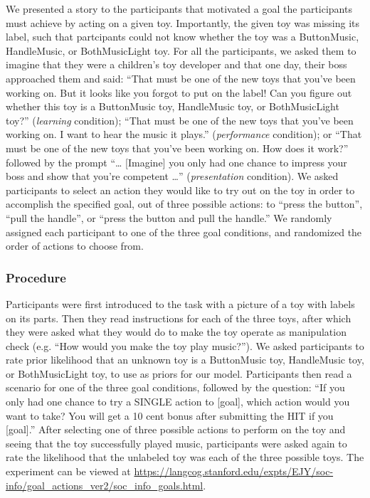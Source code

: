 \documentclass[10pt, letterpaper]{article}
\begin{document}
We presented a story to the participants that motivated a goal the
participants must achieve by acting on a given toy. Importantly, the
given toy was missing its label, such that partcipants could not know
whether the toy was a ButtonMusic, HandleMusic, or BothMusicLight toy.
For all the participants, we asked them to imagine that they were a
children's toy developer and that one day, their boss approached them
and said: ``That must be one of the new toys that you've been working
on. But it looks like you forgot to put on the label! Can you figure out
whether this toy is a ButtonMusic toy, HandleMusic toy, or
BothMusicLight toy?'' (\emph{learning} condition); ``That must be one of
the new toys that you've been working on. I want to hear the music it
plays.'' (\emph{performance} condition); or ``That must be one of the
new toys that you've been working on. How does it work?'' followed by
the prompt ``\ldots{} {[}Imagine{]} you only had one chance to impress
your boss and show that you're competent \ldots{}'' (\emph{presentation}
condition). We asked participants to select an action they would like to
try out on the toy in order to accomplish the specified goal, out of
three possible actions: to ``press the button'', ``pull the handle'', or
``press the button and pull the handle.'' We randomly assigned each
participant to one of the three goal conditions, and randomized the
order of actions to choose from.

\subsubsection{Procedure}\label{procedure}

Participants were first introduced to the task with a picture of a toy
with labels on its parts. Then they read instructions for each of the
three toys, after which they were asked what they would do to make the
toy operate as manipulation check (e.g. ``How would you make the toy
play music?''). We asked participants to rate prior likelihood that an
unknown toy is a ButtonMusic toy, HandleMusic toy, or BothMusicLight
toy, to use as priors for our model. Participants then read a scenario
for one of the three goal conditions, followed by the question: ``If you
only had one chance to try a SINGLE action to {[}goal{]}, which action
would you want to take? You will get a 10 cent bonus after submitting
the HIT if you {[}goal{]}.'' After selecting one of three possible
actions to perform on the toy and seeing that the toy successfully
played music, participants were asked again to rate the likelihood that
the unlabeled toy was each of the three possible toys. The experiment
can be viewed at
\url{https://langcog.stanford.edu/expts/EJY/soc-info/goal_actions_ver2/soc_info_goals.html}.
\end{document}
